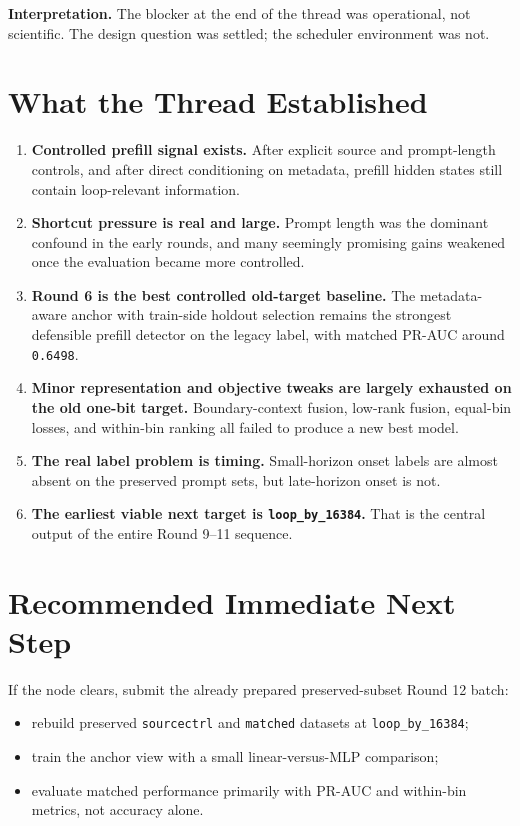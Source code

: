 \documentclass[11pt]{article}
\begin{document}
\textbf{Interpretation.} The blocker at the end of the thread was operational, not scientific. The design question was settled; the scheduler environment was not.

\section*{What the Thread Established}
\begin{enumerate}
  \item \textbf{Controlled prefill signal exists.} After explicit source and prompt-length controls, and after direct conditioning on metadata, prefill hidden states still contain loop-relevant information.
  \item \textbf{Shortcut pressure is real and large.} Prompt length was the dominant confound in the early rounds, and many seemingly promising gains weakened once the evaluation became more controlled.
  \item \textbf{Round 6 is the best controlled old-target baseline.} The metadata-aware anchor with train-side holdout selection remains the strongest defensible prefill detector on the legacy label, with matched PR-AUC around \texttt{0.6498}.
  \item \textbf{Minor representation and objective tweaks are largely exhausted on the old one-bit target.} Boundary-context fusion, low-rank fusion, equal-bin losses, and within-bin ranking all failed to produce a new best model.
  \item \textbf{The real label problem is timing.} Small-horizon onset labels are almost absent on the preserved prompt sets, but late-horizon onset is not.
  \item \textbf{The earliest viable next target is \texttt{loop\_by\_16384}.} That is the central output of the entire Round 9--11 sequence.
\end{enumerate}

\section*{Recommended Immediate Next Step}
If the node clears, submit the already prepared preserved-subset Round 12 batch:
\begin{itemize}
  \item rebuild preserved \texttt{sourcectrl} and \texttt{matched} datasets at \texttt{loop\_by\_16384};
  \item train the anchor view with a small linear-versus-MLP comparison;
  \item evaluate matched performance primarily with PR-AUC and within-bin metrics, not accuracy alone.
\end{itemize}
\end{document}
